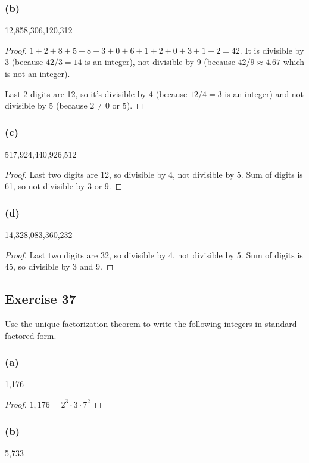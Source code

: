 \documentclass[14pt]{extarticle}
\begin{document}
\subsubsection{(b)}
12,858,306,120,312

\begin{proof}
$1+2+8+5+8+3+0+6+1+2+0+3+1+2=42$. It is divisible by 3 (because $42 / 3 = 14$ is an integer), not divisible by 9 (because $42/9 \approx 4.67$ which is not an integer).

Last 2 digits are 12, so it's divisible by 4 (because $12/4 = 3 $ is an integer) and not divisible by 5 (because $2 \neq 0$ or $5$).
\end{proof}

\subsubsection{(c)}
517,924,440,926,512

\begin{proof}
Last two digits are 12, so divisible by 4, not divisible by 5. Sum of digits is 61, so not divisible by 3 or 9.
\end{proof}

\subsubsection{(d)}
14,328,083,360,232

\begin{proof}
Last two digits are 32, so divisible by 4, not divisible by 5. Sum of digits is 45, so divisible by 3 and 9.
\end{proof}

\subsection{Exercise 37}
Use the unique factorization theorem to write the following integers in standard factored form.

\subsubsection{(a)}
1,176

\begin{proof}
$1,176 = 2^3 \cdot 3 \cdot 7^2$
\end{proof}

\subsubsection{(b)}
5,733
\end{document}
